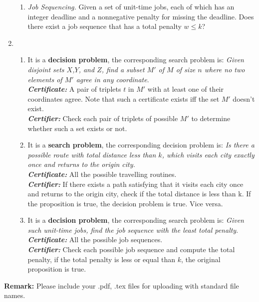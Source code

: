 \documentclass[12pt,a4paper]{article}
\makeatletter
\newtheorem*{solution}{Solution}
\theoremstyle{definition}
\renewenvironment{solution}[1][Solution] {\par\pushQED{\qed}\normalfont\topsep6\p@\@plus6\p@\relax\trivlist\item[\hskip\labelsep\bfseries#1\@addpunct{.}]\ignorespaces}{\popQED\endtrivlist\@endpefalse} \makeatother
\makeatother
\begin{document}
\begin{enumerate}
\begin{enumerate}
	    \item
	    \textit{Job Sequencing.} Given a set of unit-time jobs, each of which has an integer deadline and a nonnegative penalty for missing the deadline. Does there exist a job sequence that has a total penalty $w\leqslant k$?
	    
	\end{enumerate}
	\begin{solution}
	~\\
	\begin{enumerate}
	\item 
	It is a \textbf{decision problem}, the corresponding search problem is: \textit{Given disjoint sets $X$,$Y$, and $Z$, find a subset $M'$ of $M$ of size $n$ where no two elements of $M'$ agree in any coordinate}.
	\\
	\textbf{\textit{Certificate:}} A pair of triplets $t$ in $M'$ with at least one of their coordinates agree. Note that such a certificate exists iff the set $M'$ doesn't exist.
	\\
	\textbf{\textit{Certifier:}} Check each pair of triplets of possible $M'$ to determine whether such a set exists or not.
	\item
	It is a \textbf{search problem}, the corresponding decision problem is: \textit{Is there a possible route with total distance less than $k$, which visits each city exactly once and returns to the origin city.}
	\\
	\textbf{\textit{Certificate:}} All the possible travelling routines.
	\\
	\textbf{\textit{Certifier:}} If there exists a path satisfying that it visits each city once and returns to the origin city, check if the total distance is less than k. If the proposition is true, the decision problem is true. Vice versa.
	\item
	It is a \textbf{decision problem}, the corresponding search problem is: \textit{Given such unit-time jobs, find the job sequence with the least total penalty}.
	\\
	\textbf{\textit{Certificate:}} All the possible job sequences.
	\\
	\textbf{\textit{Certifier:}} Check each possible job sequence and compute the total penalty, if the total penalty is less or equal than $k$, the original proposition is true.
	\end{enumerate}
	\end{solution}
\end{enumerate}

\textbf{Remark:} Please include your .pdf, .tex files for uploading with standard file names.
\newpage


\end{document}
